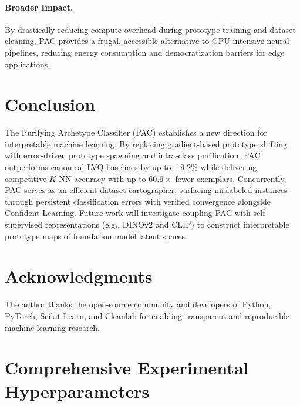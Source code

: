 \documentclass[11pt,a4paper]{article}
\begin{document}
\paragraph{Broader Impact.}
By drastically reducing compute overhead during prototype training and dataset cleaning, PAC provides a frugal, accessible alternative to GPU-intensive neural pipelines, reducing energy consumption and democratization barriers for edge applications.

\section{Conclusion}
\label{sec:conclusion}

The Purifying Archetype Classifier (PAC) establishes a new direction for interpretable machine learning. By replacing gradient-based prototype shifting with error-driven prototype spawning and intra-class purification, PAC outperforms canonical LVQ baselines by up to $+9.2\%$ while delivering competitive $K$-NN accuracy with up to $60.6\times$ fewer exemplars. Concurrently, PAC serves as an efficient dataset cartographer, surfacing mislabeled instances through persistent classification errors with verified convergence alongside Confident Learning. Future work will investigate coupling PAC with self-supervised representations (e.g., DINOv2 and CLIP) to construct interpretable prototype maps of foundation model latent spaces.

\section*{Acknowledgments}
The author thanks the open-source community and developers of Python, PyTorch, Scikit-Learn, and Cleanlab for enabling transparent and reproducible machine learning research.

\newpage



\newpage
\appendix
\section{Comprehensive Experimental Hyperparameters}
\label{sec:appendix_hyperparams}
\end{document}
